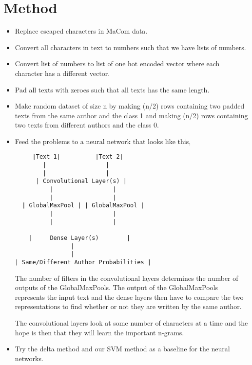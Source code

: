 \section{Method} \label{sec:method} 

\begin{itemize}
    \item Replace escaped characters in MaCom data.
    \item Convert all characters in text to numbers such that we have lists of
        numbers.
    \item Convert list of numbers to list of one hot encoded vector where each
        character has a different vector.
    \item Pad all texts with zeroes such that all texts has the same length.
    \item Make random dataset of size n by making (n/2) rows containing two
        padded texts from the same author and the class 1 and making (n/2) rows
        containing two texts from different authors and the class 0.
    \item Feed the problems to a neural network that looks like this,

        \begin{lstlisting}
     |Text 1|          |Text 2|
        |                 |
        |                 |
      | Convolutional Layer(s) |
          |                 |
          |                 |
  | GlobalMaxPool | | GlobalMaxPool |
          |                 |
          |                 |

    |     Dense Layer(s)        |
                |
                |
| Same/Different Author Probabilities |
        \end{lstlisting}

        The number of filters in the convolutional layers determines the number
        of outputs of the GlobalMaxPools. The output of the GlobalMaxPools
        represents the input text and the dense layers then have to compare the
        two representations to find whether or not they are written by the same
        author.

        The convolutional layers look at some number of characters at a time and
        the hope is then that they will learn the important n-grams.

    \item Try the delta method and our SVM method as a baseline for the neural
        networks.

\end{itemize}

